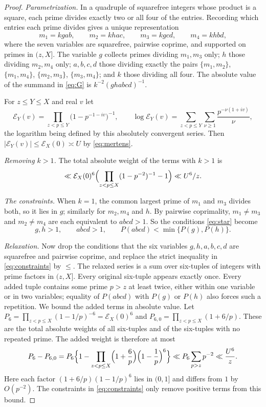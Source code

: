 \documentclass[11pt]{amsart}
\theoremstyle{remark}
\numberwithin{equation}{section}
\begin{document}
\begin{proof}
\emph{Parametrization.} In a quadruple of squarefree integers whose product is a square, each prime divides exactly two or all four of the entries. Recording which entries each prime divides gives a unique representation
\begin{equation}\label{eq:param}
m_1=kgab,\qquad m_2=khac,\qquad m_3=kgcd,\qquad m_4=khbd,
\end{equation}
where the seven variables are squarefree, pairwise coprime, and supported on primes in $(z,X]$. The variable $g$ collects primes dividing $m_1,m_3$ only; $h$ those dividing $m_2,m_4$ only; $a,b,c,d$ those dividing exactly the pairs $\{m_1,m_2\}$, $\{m_1,m_4\}$, $\{m_2,m_3\}$, $\{m_3,m_4\}$; and $k$ those dividing all four. The absolute value of the summand in \eqref{eq:G} is $k^{-2}(ghabcd)^{-1}$.

For $z\le Y\le X$ and real $v$ let
\[
\mathcal E_Y(v)=\prod_{z<p\le Y}\bigl(1-p^{-1-iv}\bigr)^{-1},\qquad\log\mathcal E_Y(v)=\sum_{z<p\le Y}\sum_{\nu\ge1}\frac{p^{-\nu(1+iv)}}{\nu},
\]
the logarithm being defined by this absolutely convergent series. Then $|\mathcal E_Y(v)|\le\mathcal E_X(0)\asymp U$ by \eqref{eq:mertens}.

\emph{Removing $k>1$.} The total absolute weight of the terms with $k>1$ is
\[
\ll\mathcal E_X(0)^6\Bigl(\prod_{z<p\le X}(1-p^{-2})^{-1}-1\Bigr)\ll U^6/z .
\]

\emph{The constraints.} When $k=1$, the common largest prime of $m_1$ and $m_3$ divides both, so it lies in $g$; similarly for $m_2,m_4$ and $h$. By pairwise coprimality, $m_1\ne m_3$ and $m_2\ne m_4$ are each equivalent to $abcd>1$. So the conditions \eqref{eq:star} become
\begin{equation}\label{eq:constraints}
g,h>1,\qquad abcd>1,\qquad P(abcd)<\min\{P(g),P(h)\}.
\end{equation}

\emph{Relaxation.} Now drop the conditions that the six variables $g,h,a,b,c,d$ are squarefree and pairwise coprime, and replace the strict inequality in \eqref{eq:constraints} by $\le$. The relaxed series is a sum over six-tuples of integers with prime factors in $(z,X]$. Every original six-tuple appears exactly once. Every added tuple contains some prime $p>z$ at least twice, either within one variable or in two variables; equality of $P(abcd)$ with $P(g)$ or $P(h)$ also forces such a repetition. We bound the added terms in absolute value. Let $P_6=\prod_{z<p\le X}(1-1/p)^{-6}=\mathcal E_X(0)^6$ and $P_{6,0}=\prod_{z<p\le X}(1+6/p)$. These are the total absolute weights of all six-tuples and of the six-tuples with no repeated prime. The added weight is therefore at most
\begin{equation}\label{eq:relaxerr}
P_6-P_{6,0}=P_6\Bigl\{1-\prod_{z<p\le X}\Bigl(1+\frac6p\Bigr)\Bigl(1-\frac1p\Bigr)^6\Bigr\}\ll P_6\sum_{p>z}p^{-2}\ll\frac{U^6}{z} .
\end{equation}
Here each factor $(1+6/p)(1-1/p)^6$ lies in $(0,1]$ and differs from $1$ by $O(p^{-2})$. The constraints in \eqref{eq:constraints} only remove positive terms from this bound.


\end{proof}
\end{document}
